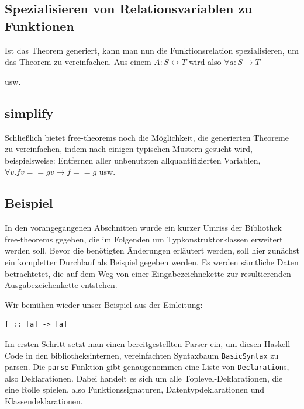 \documentclass[11pt]{article} %
\begin{document}

\subsection{Spezialisieren von Relationsvariablen zu Funktionen}

Ist das Theorem generiert, kann man nun die Funktionsrelation spezialisieren, um das Theorem zu vereinfachen. Aus einem
$A : S \leftrightarrow T$ wird also $\forall a : S \rightarrow T$

usw.

\subsection{simplify}

Schließlich bietet free-theorems noch die Möglichkeit, die generierten Theoreme zu vereinfachen, indem nach einigen typischen
Mustern gesucht wird, beispielsweise: Entfernen aller unbenutzten allquantifizierten Variablen, $\forall v. f v == g v \rightarrow f == g$ usw.

\subsection{Beispiel}

In den vorangegangenen Abschnitten wurde ein kurzer Umriss der Bibliothek free-theorems gegeben, die im Folgenden um
Typkonstruktorklassen erweitert werden soll. Bevor die benötigten Änderungen erläutert werden, soll hier zunächst ein
kompletter Durchlauf als Beispiel gegeben werden. Es werden sämtliche Daten betrachtetet, die auf dem Weg von einer
Eingabezeichnekette zur resultierenden Ausgabezeichenkette entstehen.


Wir bemühen wieder unser Beispiel aus der Einleitung:

\begin{verbatim}
f :: [a] -> [a]
\end{verbatim}

Im ersten Schritt setzt man einen bereitgestellten Parser ein, um diesen Haskell-Code in den bibliotheksinternen, vereinfachten
Syntaxbaum \texttt{BasicSyntax} zu parsen. Die \texttt{parse}-Funktion gibt genaugenommen eine Liste von \texttt{Declaration}s, also Deklarationen. Dabei handelt es sich um alle Toplevel-Deklarationen, die eine Rolle spielen, also Funktionssignaturen,
Datentypdeklarationen und Klassendeklarationen.
\end{document}
